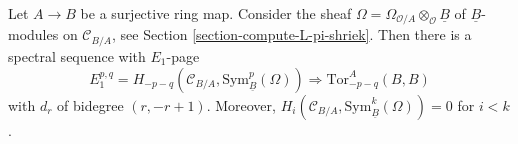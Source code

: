%
\begin{theorem}
\label{theorem-quillen-spectral-sequence}
Let $A \to B$ be a surjective ring map. Consider the sheaf
$\Omega = \Omega_{\mathcal{O}/A} \otimes_\mathcal{O} \underline{B}$ of
$\underline{B}$-modules on $\mathcal{C}_{B/A}$, see
Section \ref{section-compute-L-pi-shriek}.
Then there is a spectral sequence with $E_1$-page
$$
E_1^{p, q} =
H_{- p - q}(\mathcal{C}_{B/A}, \text{Sym}^p_{\underline{B}}(\Omega))
\Rightarrow \text{Tor}^A_{- p - q}(B, B)
$$
with $d_r$ of bidegree $(r, -r + 1)$.
Moreover, $H_i(\mathcal{C}_{B/A}, \text{Sym}^k_{\underline{B}}(\Omega)) = 0$
for $i < k$.
\end{theorem}

